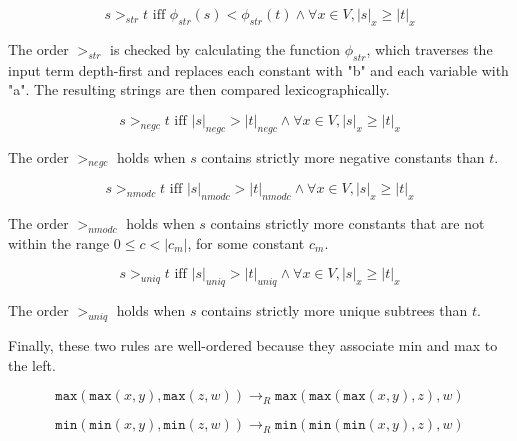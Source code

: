 \documentclass[acmsmall,review,anonymous]{acmart}\settopmatter{printfolios=true,printccs=false,printacmref=false}
\begin{document}
\begin{equation}
s >_{str} t \textrm{ iff } \phi_{str}(s) < \phi_{str}(t) \wedge \forall x \in V, |s|_x \geq |t|_x
\end{equation}

The order $>_{str}$ is checked by calculating the function $\phi_{str}$, which traverses the input term depth-first and replaces each constant with "b" and each variable with "a". The resulting strings are then compared lexicographically.

\begin{equation}
s >_{negc} t \textrm{ iff } |s|_{negc} > |t|_{negc}  \wedge \forall x \in V, |s|_x \geq |t|_x
\end{equation}

The order $>_{negc}$ holds when $s$ contains strictly more negative constants than $t$.

\begin{equation}
s >_{nmodc} t \textrm{ iff } |s|_{nmodc} > |t|_{nmodc}  \wedge \forall x \in V, |s|_x \geq |t|_x
\end{equation}

The order $>_{nmodc}$ holds when $s$ contains strictly more constants that are not within the range $0 \leq c < |c_m|$, for some constant $c_m$. 

\begin{equation}
s >_{uniq} t \textrm{ iff } |s|_{uniq} > |t|_{uniq}  \wedge \forall x \in V, |s|_x \geq |t|_x
\end{equation}

The order $>_{uniq}$ holds when $s$ contains strictly more unique subtrees than $t$.

Finally, these two rules are well-ordered because they associate min and max to the left.

\begin{equation}
\tag{max106}
\texttt{max}(\texttt{max}(x,y), \texttt{max}(z,w)) \rightarrow_R \texttt{max}(\texttt{max}(\texttt{max}(x,y),z),w)
\end{equation}

\begin{equation}
\tag{min106}
\texttt{min}(\texttt{min}(x,y), \texttt{min}(z,w)) \rightarrow_R \texttt{min}(\texttt{min}(\texttt{min}(x,y),z),w)
\end{equation}
\end{document}
